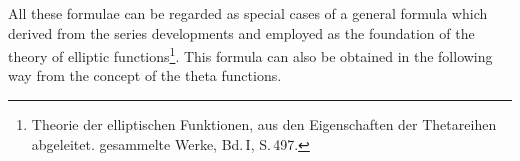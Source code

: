 All these formulae can be regarded as special cases of a general formula which  derived from the series developments and employed as the foundation of the theory of elliptic functions\footnote{Theorie der elliptischen Funktionen, aus den Eigenschaften der Thetareihen abgeleitet.  gesammelte Werke, Bd.\,I, S.\,497.}. This formula can also be obtained in the following way from the concept of the theta functions.
